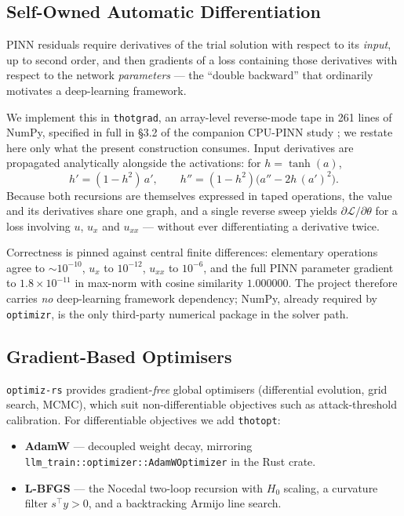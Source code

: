 \documentclass[11pt,a4paper]{article}
\theoremstyle{plain}
\theoremstyle{definition}
\begin{document}
\subsection{Self-Owned Automatic Differentiation}

PINN residuals require derivatives of the trial solution with respect to its
\emph{input}, up to second order, and then gradients of a loss containing
those derivatives with respect to the network \emph{parameters} --- the
``double backward'' that ordinarily motivates a deep-learning framework.

We implement this in \texttt{thotgrad}, an array-level reverse-mode tape in
261 lines of NumPy, specified in full in \S3.2 of the companion CPU-PINN
study \cite{alvarez2026pinn}; we restate here only what the present
construction consumes. Input derivatives are propagated analytically
alongside the activations: for $h=\tanh(a)$,
\begin{equation}
h' = (1-h^{2})\,a', \qquad
h'' = (1-h^{2})\bigl(a'' - 2h\,(a')^{2}\bigr).
\label{eq:tanhderiv}
\end{equation}
Because both recursions are themselves expressed in taped operations, the
value and its derivatives share one graph, and a single reverse sweep yields
$\partial\mathcal{L}/\partial\theta$ for a loss involving $u$, $u_x$ and
$u_{xx}$ --- without ever differentiating a derivative twice.

Correctness is pinned against central finite differences: elementary
operations agree to $\sim$$10^{-10}$, $u_x$ to $10^{-12}$, $u_{xx}$ to
$10^{-6}$, and the full PINN parameter gradient to $1.8\times10^{-11}$ in
max-norm with cosine similarity $1.000000$. The project therefore carries
\emph{no} deep-learning framework dependency; NumPy, already required by
\texttt{optimizr}, is the only third-party numerical package in the solver
path.

\subsection{Gradient-Based Optimisers}

\texttt{optimiz-rs} provides gradient-\emph{free} global optimisers
(differential evolution, grid search, MCMC), which suit non-differentiable
objectives such as attack-threshold calibration. For differentiable
objectives we add \texttt{thotopt}:

\begin{itemize}
    \item \textbf{AdamW} --- decoupled weight decay, mirroring
          \texttt{llm\_train::optimizer::AdamWOptimizer} in the Rust crate.
    \item \textbf{L-BFGS} --- the Nocedal two-loop recursion with
          $H_0$ scaling, a curvature filter $s^\top y > 0$, and a
          backtracking Armijo line search.
\end{itemize}
\end{document}
